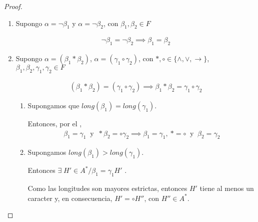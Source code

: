 \begin{proof} \phantom{.}

    \begin{enumerate}
        \item Supongo $\alpha = \neg \beta_1$ y $\alpha = \neg \beta_2$, con
            $\beta_1, \beta_2 \in F$

            \begin{gather*}
                \neg \beta_1 = \neg \beta_2 \implies \beta_1 = \beta_2
            \end{gather*}

        \item Supongo $\alpha = ( \beta_1 * \beta_2)$, 
            $\alpha = (\gamma_1 \circ \gamma_2)$, con 
            $*, \circ \in \{ \wedge,\vee,\to \}$, $\beta_1, \beta_2, 
            \gamma_1, \gamma_2 \in F$

            \begin{gather*}
                (\beta_1*\beta_2) = (\gamma_1 \circ \gamma_2)
                \implies \beta_1 * \beta_2 = \gamma_1 \circ \gamma_2
            \end{gather*}

            \begin{enumerate}
                \item Supongamos que $long(\beta_1) = long(\gamma_1)$.

                    Entonces, por el
                    ,
                    \begin{gather*}
                        \beta_1 = \gamma_1
                        ~ \text{ y } ~
                        *\beta_2 = \circ \gamma_2
                        \implies \beta_1 = \gamma_1,
                        ~ * = \circ
                        ~ \text{ y } ~
                        \beta_2 = \gamma_2
                    \end{gather*}
                    
                \item Supongamos $long(\beta_1) > long(\gamma_1)$.

                    Entonces 
                    $\exists \; H'\in A^{*} / \beta_1 = \gamma_1 H'$
                    .

                    Como las longitudes son mayores estrictas, entonces $H'$
                    tiene al menos un caracter y, en consecuencia, 
                    $H'=\circ H''$, con $H'' \in A^{*}$.


\end{enumerate}
\end{enumerate}
\end{proof}
